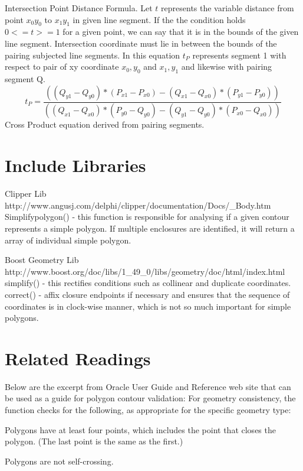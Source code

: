 \documentclass{sig-alternate}
\begin{document}
Intersection Point Distance Formula.
Let $t$ represents the variable distance from point $x_0y_0$ to $x_1y_1$ in given line segment. If the the condition holds $0<= t >= 1$
for a given point, we can say that it is in the bounds of the given line segment. Intersection coordinate must lie in between the bounds of the pairing subjected line segments. In this equation $t_P$ represents segment 1 with respect to pair of xy coordinate $x_0,y_0$ and $x_1,y_1$ and likewise with pairing segment Q.
\begin{equation}
    t_P =
    \frac {((Q_{y1}-Q_{y0})*(P_{x1}-P_{x0})-(Q_{x1}-Q_{x0})*(P_{y1}-P_{y0}))} {((Q_{x1}-Q_{x0})*(P_{y0}-Q_{y0})-(Q_{y1}-Q_{y0})*(P_{x0}-Q_{x0}))}
\end{equation}
Cross Product equation derived from pairing segments.


\section{Include Libraries}
Clipper Lib \\
http://www.angusj.com/delphi/clipper/documentation/Docs/\_Body.htm
Simplifypolygon() - this function is responsible for analysing if a given contour represents a simple polygon. If multiple enclosures are identified, it will return a array of individual simple polygon.

Boost Geometry Lib \\
http://www.boost.org/doc/libs/1\_49\_0/libs/geometry/doc/html/index.html
simplify() - this rectifies conditions such as collinear and duplicate coordinates.
correct() - affix closure endpoints if necessary and ensures that the sequence of coordinates is in clock-wise manner, which is not so much important for simple polygons.


\section{Related Readings}
Below are the excerpt from Oracle User Guide and Reference web site that can be used as a guide for polygon contour validation:
For geometry consistency, the function checks for the following, as appropriate for the specific geometry type:

Polygons have at least four points, which includes the point that closes the polygon. (The last point is the same as the first.)

Polygons are not self-crossing.
\end{document}
